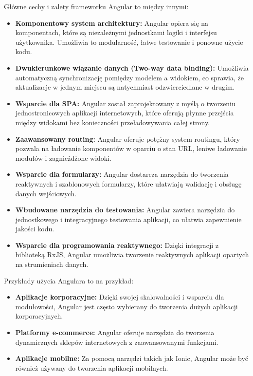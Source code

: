 Główne cechy i zalety frameworku Angular to między innymi:
\begin{itemize}
\item \textbf{Komponentowy system architektury:} Angular opiera się na komponentach, które są niezależnymi jednostkami logiki i interfejsu użytkownika. Umożliwia to modularność, łatwe testowanie i ponowne użycie kodu.

\item \textbf{Dwukierunkowe wiązanie danych (Two-way data binding):} Umożliwia automatyczną synchronizację pomiędzy modelem a widokiem, co sprawia, że aktualizacje w jednym miejscu są natychmiast odzwierciedlane w drugim.

\item \textbf{Wsparcie dla SPA:} Angular został zaprojektowany z myślą o tworzeniu jednostronicowych aplikacji internetowych, które oferują płynne przejścia między widokami bez konieczności przeładowywania całej strony.

\item \textbf{Zaawansowany routing:} Angular oferuje potężny system routingu, który pozwala na ładowanie komponentów w oparciu o stan URL, leniwe ładowanie modułów i zagnieżdżone widoki.

\item \textbf{Wsparcie dla formularzy:} Angular dostarcza narzędzia do tworzenia reaktywnych i szablonowych formularzy, które ułatwiają walidację i obsługę danych wejściowych.

\item \textbf{Wbudowane narzędzia do testowania:} Angular zawiera narzędzia do jednostkowego i integracyjnego testowania aplikacji, co ułatwia zapewnienie jakości kodu.

\item \textbf{Wsparcie dla programowania reaktywnego:} Dzięki integracji z biblioteką RxJS, Angular umożliwia tworzenie reaktywnych aplikacji opartych na strumieniach danych.
\end{itemize}

Przykłady użycia Angulara to na przykład:
\begin{itemize}
\item \textbf{Aplikacje korporacyjne:} Dzięki swojej skalowalności i wsparciu dla modułowości, Angular jest często wybierany do tworzenia dużych aplikacji korporacyjnych.

\item \textbf{Platformy e-commerce:} Angular oferuje narzędzia do tworzenia dynamicznych sklepów internetowych z zaawansowanymi funkcjami.

\item \textbf{Aplikacje mobilne:} Za pomocą narzędzi takich jak Ionic, Angular może być również używany do tworzenia aplikacji mobilnych.
\end{itemize}

